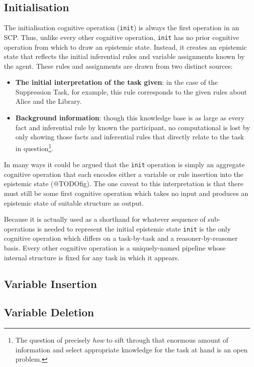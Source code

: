 \documentclass[
11pt, %
english, %
singlespacing, %
headsepline, %
]{MastersDoctoralThesis} %
\begin{document}
\subsection{Initialisation}
The initialisation cognitive operation (\texttt{init}) is always the first operation in an SCP. Thus, unlike every other cognitive operation, \texttt{init} has no prior cognitive operation from which to draw an epistemic state. Instead, it creates an epistemic state that reflects the initial inferential rules and variable assignments known by the agent. These rules and assignments are drawn from two distinct sources:
\begin{itemize}
\item \textbf{The initial interpretation of the task given}: in the case of the Suppression Task, for example, this rule corresponds to the given rules about Alice and the Library.
\item \textbf{Background information}: though this knowledge base is as large as every fact and inferential rule by known the participant, no computational is lost by only showing those facts and inferential rules that directly relate to the task in question\footnote{The question of precisely \textit{how} to sift through that enormous amount of information and select appropriate knowledge for the task at hand is an open problem.}.
\end{itemize}

In many ways it could be argued that the \texttt{init} operation is simply an aggregate cognitive operation that each encodes either a variable or rule insertion into the epistemic state (@TODOfig). The one caveat to this interpretation is that there must still be some first cognitive operation which takes no input and produces an epistemic state of suitable structure as output.

Because it is actually used as a shorthand for whatever sequence of sub-operations is needed to represent the initial epistemic state \texttt{init} is the only cognitive operation which differs on a task-by-task and a reasoner-by-reasoner basis. Every other cognitive operation is a uniquely-named pipeline whose internal structure is fixed for any task in which it appears.

\subsection{Variable Insertion}


\subsection{Variable Deletion}
\end{document}
